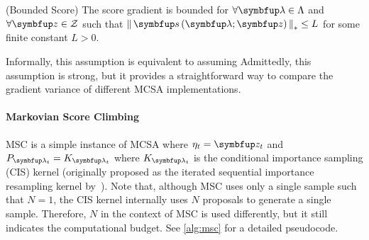 
\begin{assumption}{(Bounded Score)}\label{thm:bounded_score}
  The score gradient is bounded for \(\forall \vlambda \in \Lambda\) and \(\forall \vz \in \mathcal{Z}\) such that \(\norm{\vs\left(\vlambda; \vz\right)}_* \leq L \) for some finite constant \(L > 0\).
\end{assumption}
\vspace{-0.05in}
Informally, this assumption is equivalent to assuming 
Admittedly, this assumption is strong, but it provides a straightforward way to compare the gradient variance of different MCSA implementations.

\vspace{-0.05in}
\paragraph{Markovian Score Climbing}
MSC is a simple instance of MCSA where \(\eta_t = \vz_t\) and \(P_{\vlambda_t} = K_{\vlambda_t}\) where \(K_{\vlambda_t}\) is the conditional importance sampling (CIS) kernel (originally proposed as the iterated sequential importance resampling kernel by~\citet{andrieu_uniform_2018}).
Note that, although MSC uses only a single sample such that \(N=1\), the CIS kernel internally uses \(N\) proposals to generate a single sample.
Therefore, \(N\) in the context of MSC is used differently, but it still indicates the computational budget.
See \cref{alg:msc} for a detailed pseudocode.




